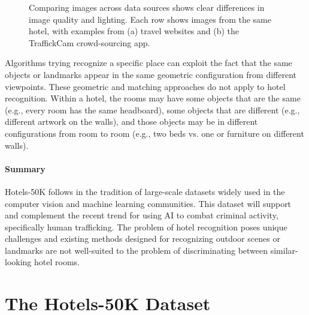 \begin{figure}
\begin{tabular}{ccc|ccc}
        

    \end{tabular}
    \caption[Image variability from different sources]{Comparing images across data sources shows clear differences in image quality and lighting.  Each row shows images from the same hotel, with examples from (a) travel websites and (b) the TraffickCam crowd-sourcing app.}
    \label{fig:domainImages}
\end{figure}

Algorithms trying recognize a specific place can exploit the fact that the same objects or landmarks appear in the same geometric configuration from different viewpoints. These geometric and matching approaches do not apply to hotel recognition.
Within a hotel, the rooms may have some objects that are the same (e.g., every room has the same headboard), some objects that are different (e.g., different artwork on the walls), and those objects may be in different configurations from room to room (e.g., two beds vs. one or furniture on different walls).

\paragraph{Summary} Hotels-50K follows in the tradition of large-scale datasets widely used in the computer vision and machine learning communities. This dataset will support and complement the recent trend for using AI to combat criminal activity, specifically human trafficking. The problem of hotel recognition poses unique challenges and existing methods designed for recognizing outdoor scenes or landmarks are not well-suited to the problem of discriminating between similar-looking hotel rooms. 

\section{The Hotels-50K Dataset}


